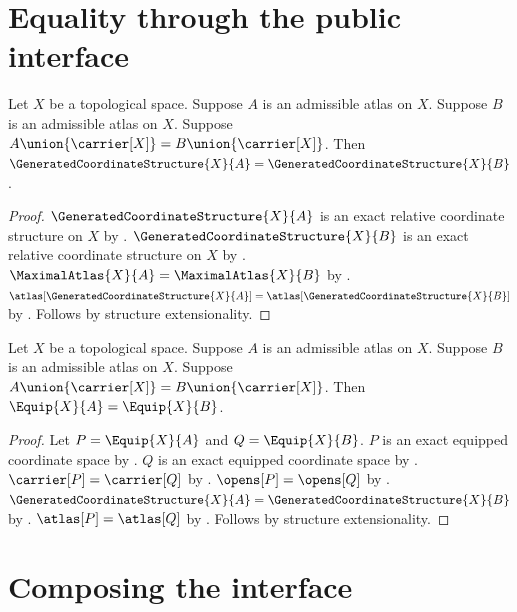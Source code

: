 \section{Equality through the public interface}

\begin{theorem}\label{generated_coordinate_structure_equal}
    Let $X$ be a topological space.
    Suppose $A$ is an admissible atlas on $X$.
    Suppose $B$ is an admissible atlas on $X$.
    Suppose $A\union\{\carrier[X]\}=B\union\{\carrier[X]\}$.
    Then $\GeneratedCoordinateStructure{X}{A}=\GeneratedCoordinateStructure{X}{B}$.
\end{theorem}
\begin{proof}
    $\GeneratedCoordinateStructure{X}{A}$ is an exact relative coordinate structure on $X$
        by .
    $\GeneratedCoordinateStructure{X}{B}$ is an exact relative coordinate structure on $X$
        by .
    $\MaximalAtlas{X}{A}=\MaximalAtlas{X}{B}$ by .
    $\atlas[\GeneratedCoordinateStructure{X}{A}]=\atlas[\GeneratedCoordinateStructure{X}{B}]$
        by .
    Follows by structure extensionality.
\end{proof}

\begin{theorem}\label{equip_equal}
    Let $X$ be a topological space.
    Suppose $A$ is an admissible atlas on $X$.
    Suppose $B$ is an admissible atlas on $X$.
    Suppose $A\union\{\carrier[X]\}=B\union\{\carrier[X]\}$.
    Then $\Equip{X}{A}=\Equip{X}{B}$.
\end{theorem}
\begin{proof}
    Let $P=\Equip{X}{A}$ and $Q=\Equip{X}{B}$.
    $P$ is an exact equipped coordinate space by .
    $Q$ is an exact equipped coordinate space by .
    $\carrier[P]=\carrier[Q]$ by .
    $\opens[P]=\opens[Q]$ by .
    $\GeneratedCoordinateStructure{X}{A}=\GeneratedCoordinateStructure{X}{B}$
        by .
    $\atlas[P]=\atlas[Q]$ by .
    Follows by structure extensionality.
\end{proof}


\section{Composing the interface}

